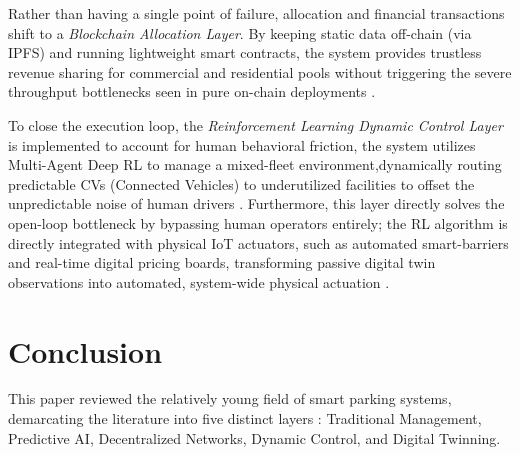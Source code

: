 \documentclass[conference]{IEEEtran}
\begin{document}
Rather than having a single point of failure, allocation and financial transactions shift to a \textit{Blockchain Allocation Layer}. By keeping static data off-chain (via IPFS) and running lightweight smart contracts, the system provides trustless revenue sharing for commercial and residential pools without triggering the severe throughput bottlenecks seen in pure on-chain deployments \cite{b39,b40}.

To close the execution loop, the \textit{Reinforcement Learning Dynamic Control Layer} is implemented to account for human behavioral friction, the system utilizes Multi-Agent Deep RL to manage a mixed-fleet environment,dynamically routing predictable CVs (Connected Vehicles) to underutilized facilities to offset the unpredictable noise of human drivers \cite{b23}. Furthermore, this layer directly solves the open-loop bottleneck by bypassing human operators entirely; the RL algorithm is directly integrated with physical IoT actuators, such as automated smart-barriers and real-time digital pricing boards, transforming passive digital twin observations into automated, system-wide physical actuation \cite{b11,b22}.

\section{Conclusion}
This paper reviewed the relatively young field of smart parking systems, demarcating the literature into five distinct layers : Traditional Management, Predictive AI, Decentralized Networks, Dynamic Control, and Digital Twinning. 
\end{document}
